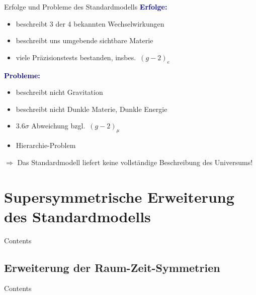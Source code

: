 \documentclass[hyperref={pdfpagelabels=false},ngerman]{beamer}
\renewcommand{\emph}[1]{\textbf{\textcolor{darkblue}{#1}}}
\begin{document}
\begin{frame}{Erfolge und Probleme des Standardmodells}
  \emph{Erfolge:}
  \begin{itemize}
  \item beschreibt 3 der 4 bekannten Wechselwirkungen
  \item beschreibt uns umgebende sichtbare Materie
  \item viele Präzisionstests bestanden, insbes.\ $(g-2)_e$
  \end{itemize}
  \vspace*{1em}
  \emph{Probleme:}
  \begin{itemize}
  \item beschreibt nicht Gravitation
  \item beschreibt nicht Dunkle Materie, Dunkle Energie
  \item $3.6\sigma$ Abweichung bzgl.\ $(g-2)_\mu$
  \item Hierarchie-Problem
  \end{itemize}
  \vspace*{1em}
  $\Rightarrow$ Das Standardmodell liefert keine vollständige Beschreibung
  des Universums!
\end{frame}


\section{Supersymmetrische Erweiterung des Standardmodells}

\begin{frame}{Contents}
  \tableofcontents[currentsection]
\end{frame}

\subsection{Erweiterung der Raum-Zeit-Symmetrien}

\begin{frame}{Contents}
  \tableofcontents[currentsubsection]
\end{frame}
\end{document}
